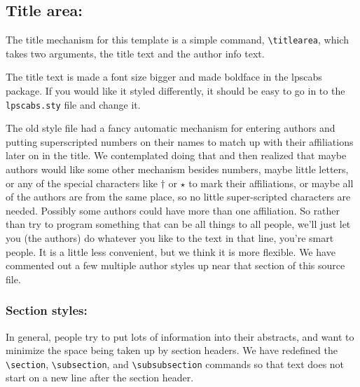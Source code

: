 \documentclass[twoside]{article}
\begin{document}
\subsection*{\hspace{0.5cm}Title area:}
The title mechanism for this template is a simple command, \verb=\titlearea=, which takes two arguments, the title text and the author info text.

The title text is made a font size bigger and made boldface in the lpscabs package.  
If you would like it styled differently, it should be easy to go in to the \texttt{lpscabs.sty} file and change it.

The old style file had a fancy automatic mechanism for entering authors and putting superscripted numbers on their names to match up with their affiliations later on in the title.
We contemplated doing that and then realized that maybe authors would like some other mechanism besides numbers, maybe little letters, or any of the special characters like $\dag$ or $\star$ to mark their affiliations, or maybe all of the authors are from the same place, so no little super-scripted characters are needed.
Possibly some authors could have more than one affiliation.
So rather than try to program something that can be all things to all people, we'll just let you (the authors) do whatever you like to the text in that line, you're smart people.
It is a little less convenient, but we think it is more flexible.
We have commented out a few multiple author styles up near that section of this source file.

\subsubsection*{\hspace{0.5cm}Section styles:} 
In general, people try to put lots of information into their abstracts, and want to minimize the space being taken up by section headers.
We have redefined the \verb=\section=, \verb=\subsection=, and \verb=\subsubsection= commands so that text does not start on a new line after the section header.
\end{document}
